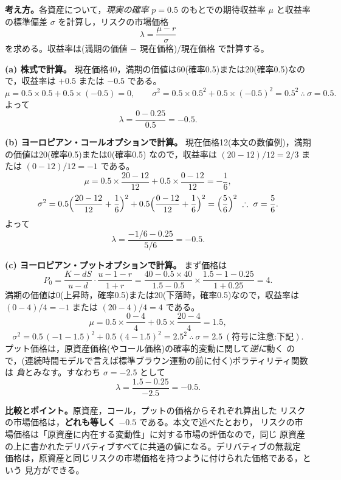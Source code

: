 \begin{answerbox}
\textbf{考え方。}各資産について，\emph{現実の確率} $p=0.5$ のもとでの期待収益率
$\mu$ と収益率の標準偏差 $\sigma$ を計算し，リスクの市場価格
\[
\lambda = \frac{\mu - r}{\sigma}
\]
を求める。収益率は(満期の価値 $-$ 現在価格)/現在価格 で計算する。

\medskip
\textbf{(a) 株式で計算。}
現在価格40，満期の価値は60(確率0.5)または20(確率0.5)なので，収益率は
$+0.5$ または $-0.5$ である。
\[
\mu = 0.5\times 0.5 + 0.5\times(-0.5) = 0,
\qquad
\sigma^2 = 0.5\times 0.5^2 + 0.5\times(-0.5)^2 = 0.5^2
\ \therefore\ \sigma = 0.5.
\]
よって
\[
\lambda = \frac{0 - 0.25}{0.5} = -0.5.
\]

\medskip
\textbf{(b) ヨーロピアン・コールオプションで計算。}
現在価格12(本文の数値例)，満期の価値は20(確率0.5)または0(確率0.5)
なので，収益率は $(20-12)/12 = 2/3$ または $(0-12)/12 = -1$ である。
\[
\mu = 0.5\times\frac{20-12}{12} + 0.5\times\frac{0-12}{12} = -\frac{1}{6},
\]
\[
\sigma^2 = 0.5\Bigl(\frac{20-12}{12}+\frac{1}{6}\Bigr)^2
+ 0.5\Bigl(\frac{0-12}{12}+\frac{1}{6}\Bigr)^2 = \Bigl(\frac{5}{6}\Bigr)^2
\ \therefore\ \sigma = \frac{5}{6}.
\]
よって
\[
\lambda = \frac{-1/6 - 0.25}{5/6} = -0.5.
\]

\medskip
\textbf{(c) ヨーロピアン・プットオプションで計算。}
まず価格は
\[
P_0 = \frac{K - dS}{u-d}\cdot\frac{u-1-r}{1+r}
= \frac{40 - 0.5\times 40}{1.5-0.5}\times\frac{1.5-1-0.25}{1+0.25} = 4.
\]
満期の価値は0(上昇時，確率0.5)または20(下落時，確率0.5)なので，収益率は
$(0-4)/4 = -1$ または $(20-4)/4 = 4$ である。
\[
\mu = 0.5\times\frac{0-4}{4} + 0.5\times\frac{20-4}{4} = 1.5,
\]
\[
\sigma^2 = 0.5\,(-1-1.5)^2 + 0.5\,(4-1.5)^2 = 2.5^2
\ \therefore\ \sigma = 2.5\ (\text{符号に注意:下記}).
\]
プット価格は，原資産価格(やコール価格)の確率的変動に関して\emph{逆に}動く
ので，(連続時間モデルで言えば標準ブラウン運動の前に付く)ボラティリティ関数は
\emph{負}とみなす。すなわち $\sigma = -2.5$ として
\[
\lambda = \frac{1.5 - 0.25}{-2.5} = -0.5.
\]

\medskip
\textbf{比較とポイント。}原資産，コール，プットの価格からそれぞれ算出した
リスクの市場価格は，\textbf{どれも等しく $-0.5$} である。本文で述べたとおり，
リスクの市場価格は「原資産に内在する変動性」に対する市場の評価なので，同じ
原資産の上に書かれたデリバティブすべてに共通の値になる。デリバティブの無裁定
価格は，原資産と同じリスクの市場価格を持つように付けられた価格である，という
見方ができる。
\end{answerbox}
